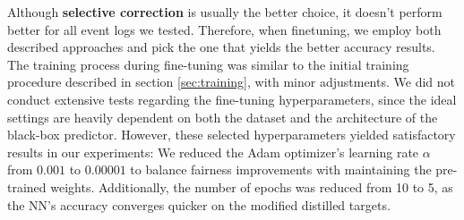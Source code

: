 Although \textbf{selective correction} is usually the better choice, it doesn't perform better for all event logs we tested.
Therefore, when finetuning, we employ both described approaches and pick the one that yields the better accuracy results.
The training process during fine-tuning was similar to the initial training procedure
described in section \ref{sec:training}, with minor adjustments.
We did not conduct extensive tests regarding the fine-tuning hyperparameters,
since the ideal settings are heavily dependent on both the 
dataset and the architecture of the black-box predictor.
However, these selected hyperparameters yielded satisfactory results in our experiments:
We reduced the Adam optimizer's learning rate $\alpha$ from $0.001$
to $0.00001$ to balance fairness improvements with maintaining the pre-trained weights.
Additionally, the number of epochs was reduced from 10 to 5,
as the NN's accuracy converges quicker on the modified distilled targets.